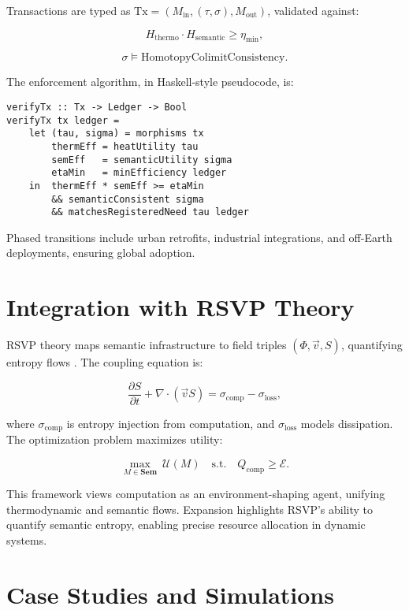 \documentclass[12pt]{article}
\begin{document}
Transactions are typed as $ \mathrm{Tx} = (M_{\mathrm{in}}, (\tau, \sigma), M_{\mathrm{out}}) $, validated against:

\[ H_{\mathrm{thermo}} \cdot H_{\mathrm{semantic}} \geq \eta_{\min}, \]

\[ \sigma \models \text{HomotopyColimitConsistency}. \]

The enforcement algorithm, in Haskell-style pseudocode, is:

\begin{verbatim}
verifyTx :: Tx -> Ledger -> Bool
verifyTx tx ledger =
    let (tau, sigma) = morphisms tx
        thermEff = heatUtility tau
        semEff   = semanticUtility sigma
        etaMin   = minEfficiency ledger
    in  thermEff * semEff >= etaMin
        && semanticConsistent sigma
        && matchesRegisteredNeed tau ledger
\end{verbatim}

Phased transitions include urban retrofits, industrial integrations, and off-Earth deployments, ensuring global adoption.

\section{Integration with RSVP Theory}
\label{sec:rsvp-integration}

RSVP theory maps semantic infrastructure to field triples $ (\Phi, \vec{v}, S) $, quantifying entropy flows \citep{Shulman2012}. The coupling equation is:

\[ \frac{\partial S}{\partial t} + \nabla \cdot (\vec{v} S) = \sigma_{\mathrm{comp}} - \sigma_{\mathrm{loss}}, \]

where $ \sigma_{\mathrm{comp}} $ is entropy injection from computation, and $ \sigma_{\mathrm{loss}} $ models dissipation. The optimization problem maximizes utility:

\[ \max_{M \in \mathbf{Sem}} \ \mathcal{U}(M) \quad \text{s.t.} \quad Q_{\mathrm{comp}} \geq \mathcal{E}. \]

This framework views computation as an environment-shaping agent, unifying thermodynamic and semantic flows. Expansion highlights RSVP’s ability to quantify semantic entropy, enabling precise resource allocation in dynamic systems.

\section{Case Studies and Simulations}
\label{sec:case-studies}
\end{document}
